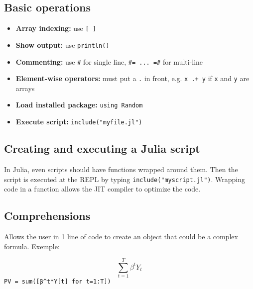 \documentclass[11pt]{article}
\begin{document}
\subsection{Basic operations}
\label{sec:org53fb074}

\begin{itemize}
\item \textbf{Array indexing:} use \texttt{[ ]}
\item \textbf{Show output:} use \texttt{println()}
\item \textbf{Commenting:} use \texttt{\#} for single line, \texttt{\#= ... =\#} for multi-line
\item \textbf{Element-wise operators:} must put a \texttt{.} in front, e.g. \texttt{x .+ y} if \texttt{x} and \texttt{y} are arrays
\item \textbf{Load installed package:} \texttt{using Random}
\item \textbf{Execute script:} \texttt{include("myfile.jl")}
\end{itemize}

\subsection{Creating and executing a Julia script}
\label{sec:orgf3ab864}

In Julia, even scripts should have functions wrapped around them. Then the script is executed at the REPL by typing \texttt{include("myscript.jl")}. Wrapping code in a function allows the JIT compiler to optimize the code.

\subsection{Comprehensions}
\label{sec:org0501d40}

Allows the user in 1 line of code to create an object that could be a complex formula. Exemple:

$$
\sum^T_{t=1} \beta^tY_t
$$
\texttt{PV = sum([β\textasciicircum{}t*Y[t] for t=1:T])}
\end{document}
